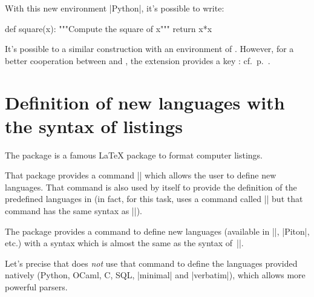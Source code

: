 \documentclass{article}
\begin{document}
\bigskip
With this new environment |{Python}|, it's possible to write:


  {\begin{mdframed}[roundcorner=3mm]}
  {\end{mdframed}}

\begin{Python}
def square(x):
    """Compute the square of x"""
    return x*x
\end{Python}

\bigskip
It's possible to a similar construction with an environment of .
However, for a better cooperation between  and , the
extension  provides a key : cf.~p.~\pageref{tcolorbox}.


\section{Definition of new languages with the syntax of listings}

\label{NewPitonLanguage}

\medskip
The package  is a famous LaTeX package to format computer
listings.

That package provides a command |\lstdefinelanguage| which allows the user to
define new languages. That command is also used by  itself to
provide the definition of the predefined languages in  (in fact,
for this task,  uses a command called |\lst@definelanguage| but
that command has the same syntax as |\lstdefinelanguage|). 

\medskip
The package  provides a command
 to define new languages (available in
|\piton|, |{Piton}|, etc.) with a syntax which is almost the same as the
syntax of~|\lstdefinelanguage|.

Let's precise that  does \emph{not} use that command to define the
languages provided natively (Python, OCaml, C, SQL, |minimal| and |verbatim|),
which allows more powerful parsers.
\end{document}
